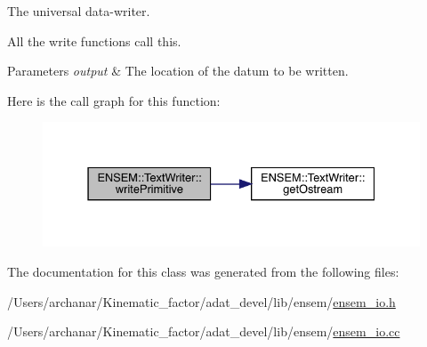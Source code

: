 The universal data-\/writer. 

All the write functions call this. 
\begin{DoxyParams}{Parameters}
{\em output} & The location of the datum to be written. \\
\hline
\end{DoxyParams}
Here is the call graph for this function\+:\nopagebreak
\begin{figure}[H]
\begin{center}
\leavevmode
\includegraphics[width=331pt]{db/d53/classENSEM_1_1TextWriter_aca159ff3db64ed918f7e4ddfed7a6d53_cgraph}
\end{center}
\end{figure}


The documentation for this class was generated from the following files\+:\begin{DoxyCompactItemize}
\item 
/\+Users/archanar/\+Kinematic\+\_\+factor/adat\+\_\+devel/lib/ensem/\mbox{\hyperlink{lib_2ensem_2ensem__io_8h}{ensem\+\_\+io.\+h}}\item 
/\+Users/archanar/\+Kinematic\+\_\+factor/adat\+\_\+devel/lib/ensem/\mbox{\hyperlink{ensem__io_8cc}{ensem\+\_\+io.\+cc}}\end{DoxyCompactItemize}
